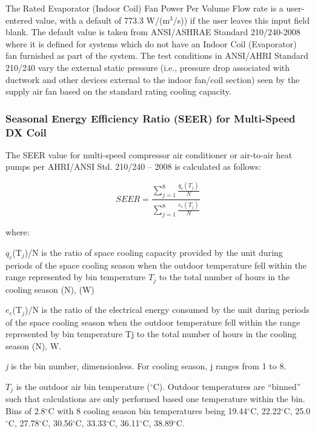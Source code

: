 The Rated Evaporator (Indoor Coil) Fan Power Per Volume Flow rate is a user-entered value, with a default of 773.3 W/(m\(^{3}\)/s)) if the user leaves this input field blank. The default value is taken from ANSI/ASHRAE Standard 210/240-2008 where it is defined for systems which do not have an Indoor Coil (Evaporator) fan furnished as part of the system. The test conditions in ANSI/AHRI Standard 210/240 vary the external static pressure (i.e., pressure drop associated with ductwork and other devices external to the indoor fan/coil section) seen by the supply air fan based on the standard rating cooling capacity.

\subsubsection{Seasonal Energy Efficiency Ratio (SEER) for Multi-Speed DX Coil}\label{seasonal-energy-efficiency-ratio-seer-for-multi-speed-dx-coil}

The SEER value for multi-speed compressor air conditioner or air-to-air heat pumps per AHRI/ANSI Std. 210/240 -- 2008 is calculated as follows:

\begin{equation}
SEER = \frac{{\sum\limits_{j = 1}^8 {\frac{{{q_c}({T_j})}}{N}} }}{{\sum\limits_{j = 1}^8 {\frac{{{e_c}({T_j})}}{N}} }}
\end{equation}

where:

\(q_{c}\)(T\(_{j}\))/N is the ratio of space cooling capacity provided by the unit during periods of the space cooling season when the outdoor temperature fell within the range represented by bin temperature \(T_{j}\) to the total number of hours in the cooling season (N), (W)

\(e_{c}\)(T\(_{j}\))/N is the ratio of the electrical energy consumed by the unit during periods of the space cooling season when the outdoor temperature fell within the range represented by bin temperature Tj to the total number of hours in the cooling season (N), W.

\emph{j} is the bin number, dimensionless. For cooling season, j ranges from 1 to 8.

\(T_{j}\) is the outdoor air bin temperature (\(^{\circ}\)C). Outdoor temperatures are ``binned'' such that calculations are only performed based one temperature within the bin. Bins of 2.8\(^{\circ}\)C with 8 cooling season bin temperatures being 19.44\(^{\circ}\)C, 22.22\(^{\circ}\)C, 25.0\(^{\circ}\)C, 27.78\(^{\circ}\)C, 30.56\(^{\circ}\)C, 33.33\(^{\circ}\)C, 36.11\(^{\circ}\)C, 38.89\(^{\circ}\)C.

